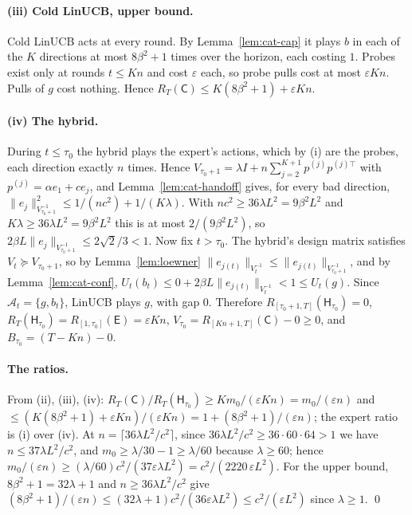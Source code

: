 \documentclass{article}
\theoremstyle{definition}
\theoremstyle{remark}
\newcommand{\eps}{\varepsilon}
\theoremstyle{remark}
\newcommand{\Cold}{\mathsf{C}}
\newcommand{\Exp}{\mathsf{E}}
\newcommand{\Hyb}{\mathsf{H}}
\begin{document}
\paragraph{(iii) Cold LinUCB, upper bound.}
Cold LinUCB acts at every round. By Lemma~\ref{lem:cat-cap} it plays $b$ in
each of the $K$ directions at most $8\beta^2+1$ times over the horizon, each
costing $1$. Probes exist only at rounds $t\le Kn$ and cost $\eps$ each, so
probe pulls cost at most $\eps Kn$. Pulls of $g$ cost nothing. Hence
$R_T(\Cold)\le K(8\beta^2+1)+\eps Kn$.

\paragraph{(iv) The hybrid.}
During $t\le\tau_0$ the hybrid plays the expert's actions, which by (i) are
the probes, each direction exactly $n$ times. Hence
$V_{\tau_0+1}=\lambda I+n\sum_{j=2}^{K+1}p^{(j)}p^{(j)\top}$ with $p^{(j)}=\alpha e_1+ce_j$,
and Lemma~\ref{lem:cat-handoff} gives, for every bad direction,
$\|e_j\|^2_{V_{\tau_0+1}^{-1}}\le1/(nc^2)+1/(K\lambda)$. With $nc^2\ge36\lambda L^2=9\beta^2L^2$
and $K\lambda\ge36\lambda L^2=9\beta^2L^2$ this is at most $2/(9\beta^2L^2)$, so
$2\beta L\|e_j\|_{V_{\tau_0+1}^{-1}}\le2\sqrt2/3<1$. Now fix $t>\tau_0$. The
hybrid's design matrix satisfies $V_t\succeq V_{\tau_0+1}$, so by
Lemma~\ref{lem:loewner} $\|e_{j(t)}\|_{V_t^{-1}}\le\|e_{j(t)}\|_{V_{\tau_0+1}^{-1}}$,
and by Lemma~\ref{lem:cat-conf}, $U_t(b_t)\le0+2\beta L\|e_{j(t)}\|_{V_t^{-1}}<1\le U_t(g)$.
Since $\mathcal A_t=\{g,b_t\}$, LinUCB plays $g$, with gap $0$. Therefore
$R_{[\tau_0+1,T]}(\Hyb_{\tau_0})=0$, $R_T(\Hyb_{\tau_0})=R_{[1,\tau_0]}(\Exp)=\eps Kn$,
$V_{\tau_0}=R_{[Kn+1,T]}(\Cold)-0\ge0$, and $B_{\tau_0}=(T-Kn)-0$.

\paragraph{The ratios.}
From (ii), (iii), (iv): $R_T(\Cold)/R_T(\Hyb_{\tau_0})\ge Km_0/(\eps Kn)=m_0/(\eps n)$
and $\le(K(8\beta^2+1)+\eps Kn)/(\eps Kn)=1+(8\beta^2+1)/(\eps n)$; the
expert ratio is (i) over (iv). At $n=\lceil36\lambda L^2/c^2\rceil$, since
$36\lambda L^2/c^2\ge36\cdot60\cdot64>1$ we have $n\le37\lambda L^2/c^2$, and
$m_0\ge\lambda/30-1\ge\lambda/60$ because $\lambda\ge60$; hence
$m_0/(\eps n)\ge(\lambda/60)c^2/(37\eps\lambda L^2)=c^2/(2220\,\eps L^2)$. For the
upper bound, $8\beta^2+1=32\lambda+1$ and $n\ge36\lambda L^2/c^2$ give
$(8\beta^2+1)/(\eps n)\le(32\lambda+1)c^2/(36\eps\lambda L^2)\le c^2/(\eps L^2)$
since $\lambda\ge1$. \qed
\end{document}
